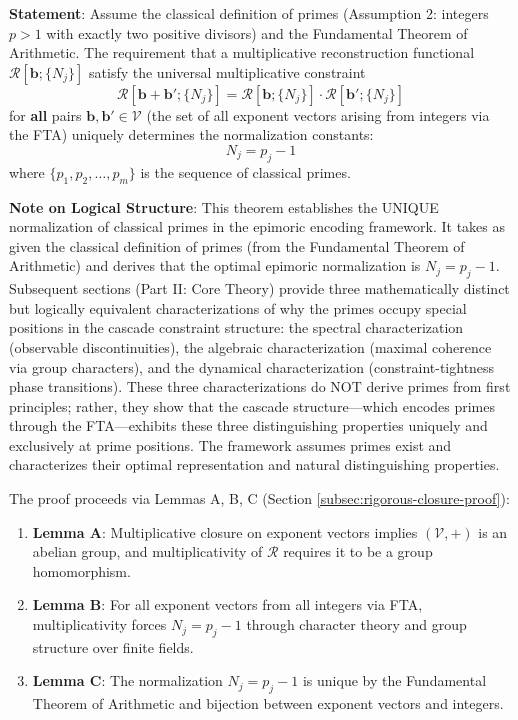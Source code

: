 \begin{theorem}
\label{thm:closure-determines-primes}
\textbf{Statement}: Assume the classical definition of primes (Assumption 2: integers $p > 1$ with exactly two positive divisors) and the Fundamental Theorem of Arithmetic. The requirement that a multiplicative reconstruction functional $\mathcal{R}[\mathbf{b}; \{N_j\}]$ satisfy the universal multiplicative constraint
\begin{equation}
\mathcal{R}[\mathbf{b} + \mathbf{b}'; \{N_j\}] = \mathcal{R}[\mathbf{b}; \{N_j\}] \cdot \mathcal{R}[\mathbf{b}';\{N_j\}]
\end{equation}
for \textbf{all} pairs $\mathbf{b}, \mathbf{b}' \in \mathcal{V}$ (the set of all exponent vectors arising from integers via the FTA) uniquely determines the normalization constants:
\begin{equation}
\label{eq:prime-normalization}
N_j = p_j - 1
\end{equation}
where $\{p_1, p_2, \ldots, p_m\}$ is the sequence of classical primes.

\noindent \textbf{Note on Logical Structure}: This theorem establishes the UNIQUE normalization of classical primes in the epimoric encoding framework. It takes as given the classical definition of primes (from the Fundamental Theorem of Arithmetic) and derives that the optimal epimoric normalization is $N_j = p_j - 1$. Subsequent sections (Part II: Core Theory) provide three mathematically distinct but logically equivalent characterizations of why the primes occupy special positions in the cascade constraint structure: the spectral characterization (observable discontinuities), the algebraic characterization (maximal coherence via group characters), and the dynamical characterization (constraint-tightness phase transitions). These three characterizations do NOT derive primes from first principles; rather, they show that the cascade structure—which encodes primes through the FTA—exhibits these three distinguishing properties uniquely and exclusively at prime positions. The framework assumes primes exist and characterizes their optimal representation and natural distinguishing properties.

The proof proceeds via Lemmas A, B, C (Section \ref{subsec:rigorous-closure-proof}):
\begin{enumerate}
\item \textbf{Lemma A}: Multiplicative closure on exponent vectors implies $(\mathcal{V}, +)$ is an abelian group, and multiplicativity of $\mathcal{R}$ requires it to be a group homomorphism.
\item \textbf{Lemma B}: For all exponent vectors from all integers via FTA, multiplicativity forces $N_j = p_j - 1$ through character theory and group structure over finite fields.
\item \textbf{Lemma C}: The normalization $N_j = p_j - 1$ is unique by the Fundamental Theorem of Arithmetic and bijection between exponent vectors and integers.
\end{enumerate}
\end{theorem}

